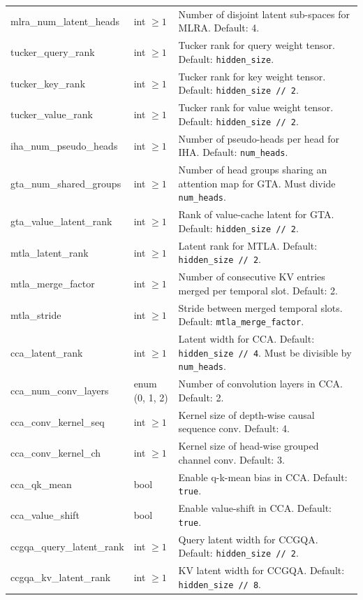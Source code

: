 \begin{longtable}{>{\ttfamily}l>{\raggedright\arraybackslash}p{3.5cm}>{\raggedright\arraybackslash}p{8.5cm}}
mlra\_num\_latent\_heads & int $\ge 1$ & Number of disjoint latent sub-spaces for MLRA. Default: 4. \\
tucker\_query\_rank & int $\ge 1$ & Tucker rank for query weight tensor. Default: \texttt{hidden\_size}. \\
tucker\_key\_rank & int $\ge 1$ & Tucker rank for key weight tensor. Default: \texttt{hidden\_size // 2}. \\
tucker\_value\_rank & int $\ge 1$ & Tucker rank for value weight tensor. Default: \texttt{hidden\_size // 2}. \\
iha\_num\_pseudo\_heads & int $\ge 1$ & Number of pseudo-heads per head for IHA. Default: \texttt{num\_heads}. \\
gta\_num\_shared\_groups & int $\ge 1$ & Number of head groups sharing an attention map for GTA. Must divide \texttt{num\_heads}. \\
gta\_value\_latent\_rank & int $\ge 1$ & Rank of value-cache latent for GTA. Default: \texttt{hidden\_size // 2}. \\
mtla\_latent\_rank & int $\ge 1$ & Latent rank for MTLA. Default: \texttt{hidden\_size // 2}. \\
mtla\_merge\_factor & int $\ge 1$ & Number of consecutive KV entries merged per temporal slot. Default: 2. \\
mtla\_stride & int $\ge 1$ & Stride between merged temporal slots. Default: \texttt{mtla\_merge\_factor}. \\
cca\_latent\_rank & int $\ge 1$ & Latent width for CCA. Default: \texttt{hidden\_size // 4}. Must be divisible by \texttt{num\_heads}. \\
cca\_num\_conv\_layers & enum (0, 1, 2) & Number of convolution layers in CCA. Default: 2. \\
cca\_conv\_kernel\_seq & int $\ge 1$ & Kernel size of depth-wise causal sequence conv. Default: 4. \\
cca\_conv\_kernel\_ch & int $\ge 1$ & Kernel size of head-wise grouped channel conv. Default: 3. \\
cca\_qk\_mean & bool & Enable q-k-mean bias in CCA. Default: \texttt{true}. \\
cca\_value\_shift & bool & Enable value-shift in CCA. Default: \texttt{true}. \\
ccgqa\_query\_latent\_rank & int $\ge 1$ & Query latent width for CCGQA. Default: \texttt{hidden\_size // 2}. \\
ccgqa\_kv\_latent\_rank & int $\ge 1$ & KV latent width for CCGQA. Default: \texttt{hidden\_size // 8}. \\

\end{longtable}
